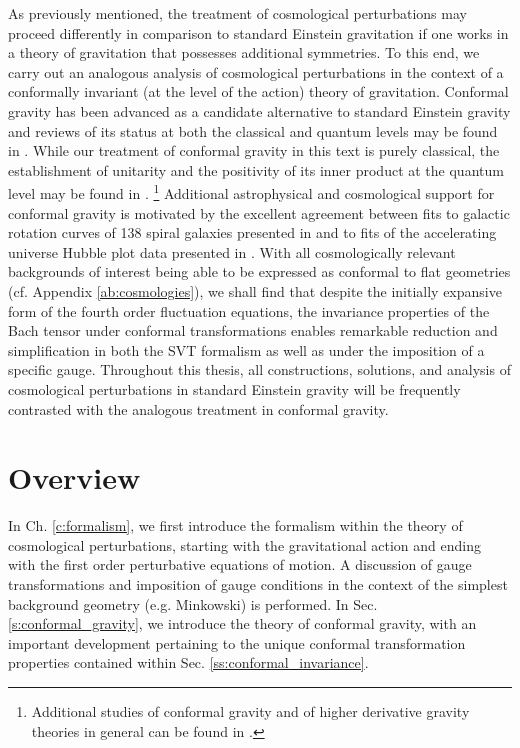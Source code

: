 As previously mentioned, the treatment of cosmological perturbations may proceed differently in comparison to standard Einstein gravitation if one works in a theory of gravitation that possesses additional symmetries. To this end, we carry out an analogous analysis of cosmological perturbations in the context of a conformally invariant (at the level of the action) theory of gravitation. Conformal gravity has been advanced as a candidate alternative to standard Einstein gravity and reviews of its status at both the classical and quantum levels may be found in \cite{mannheim_2006, mannheim_2012, mannheim_2017}. While our treatment of conformal gravity in this text is purely classical, the establishment of unitarity and the positivity of its inner product at the quantum level may be found in \cite{bender_mannheim_2008a, bender_mannheim_2008b, mannheim_2011, mannheim_2018}. 
\footnote{Additional studies of conformal gravity and of higher derivative gravity theories in general can be found in \cite{stelle_1977,stelle_1978,adler_1982,lee_nieuwenhuizen_1982,zee_1983,riegert_1984a,riegert_1984b,teyssandier_1989,hooft2010conformal,hooft2010probing,hooft_2015,maldacena2011einstein}.}
Additional astrophysical and cosmological support for conformal gravity is motivated by the excellent agreement between fits to galactic rotation curves of 138 spiral galaxies presented in \cite{mannheim_2011,mannheim_2012, obrien_mannheim_2012} and to fits of the accelerating universe Hubble plot data presented in \cite{mannheim_2006,mannheim_2017}. With all cosmologically relevant backgrounds of interest being able to be expressed as conformal to flat geometries (cf. Appendix \ref{ab:cosmologies}), we shall find that despite the initially expansive form of the fourth order fluctuation equations, the invariance properties of the Bach tensor under conformal transformations enables remarkable reduction and simplification in both the SVT formalism as well as under the imposition of a specific gauge. Throughout this thesis, all constructions, solutions, and analysis of cosmological perturbations in standard Einstein gravity will be frequently contrasted with the analogous treatment in conformal gravity.  


\section{Overview}
\label{s:overview_intro}
In Ch. \ref{c:formalism}, we first introduce the formalism within the theory of cosmological perturbations, starting with the gravitational action and ending with the first order perturbative equations of motion. A discussion of gauge transformations and imposition of gauge conditions in the context of the simplest background geometry (e.g. Minkowski) is performed. In Sec. \ref{s:conformal_gravity}, we introduce the theory of conformal gravity, with an important development pertaining to the unique conformal transformation properties contained within Sec. \ref{ss:conformal_invariance}. 

